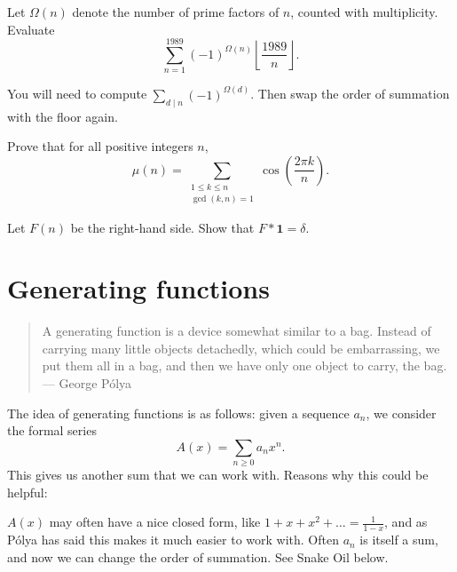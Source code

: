 \documentclass[11pt]{scrartcl}
\begin{document}
\begin{problem}
  [Bulgaria 1989]
  Let $\Omega(n)$ denote the number of prime factors of $n$,
  counted with multiplicity. Evaluate
  \[ \sum_{n=1}^{1989} (-1)^{\Omega(n)}
    \left\lfloor \frac{1989}{n} \right\rfloor.  \]
  \begin{hint}
    You will need to compute $\sum_{d \mid n} (-1)^{\Omega(d)}$.
    Then swap the order of summation with the floor again.
  \end{hint}
\end{problem}

\begin{problem}
  Prove that for all positive integers $n$,
  \[
    \mu(n)
    = \sum_{\substack{1 \le k \le n \\ \gcd(k,n)=1}}
    \cos\left( \frac{2\pi k}{n} \right).
  \]
  \begin{hint}
    Let $F(n)$ be the right-hand side.
    Show that $F \ast \mathbf 1 = \delta$.
  \end{hint}
\end{problem}

\section{Generating functions}
\begin{quote}
  A generating function is a device somewhat similar to a bag.
  Instead of carrying many little objects detachedly, which could be embarrassing, we put them all in a bag,
  and then we have only one object to carry, the bag. \\ --- George P\'olya
\end{quote}

The idea of generating functions is as follows:
given a sequence $a_n$, we consider the formal series
\[ A(x) = \sum_{n \ge 0} a_n x^n. \]
This gives us another sum that we can work with.
Reasons why this could be helpful:
\begin{itemize}
  \ii $A(x)$ may often have a nice closed form,
  like $1 + x + x^2 + \dots = \frac{1}{1-x}$,
  and as P\'olya has said this makes it much easier to work with.
  \ii Often $a_n$ is itself a sum,
  and now we can change the order of summation.
  See Snake Oil below.
\end{itemize}
\end{document}
